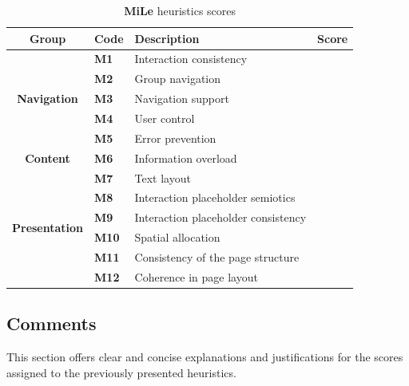 \begin{table}[htp!]
    \centering
    \begin{tabular}{ |c|l|l|c| }
        \hline
        \textbf{Group} & \textbf{Code} & \textbf{Description} & \textbf{Score}\\
        \hline
        \multirow{5}{*}{\textbf{Navigation}} & \textbf{M1} & Interaction consistency & \textbf{\color{unicefGreen}{4}}\\
        \cline{2-4}
        & \textbf{M2} & Group navigation & \textbf{\color{unicefRed}{2}}\\
        \cline{2-4}
        & \textbf{M3} & Navigation support & \textbf{\color{unicefRed}{2}}\\
        \cline{2-4}
        & \textbf{M4} & User control & \textbf{\color{unicefRed}{1}}\\
        \cline{2-4}
        & \textbf{M5} & Error prevention & \textbf{\color{unicefOrange}{3}}\\
        \hline
        \textbf{Content} & \textbf{M6} & Information overload & \textbf{\color{unicefOrange}{3}}\\
        \hline
        \multirow{6}{*}{\textbf{Presentation}} & \textbf{M7} & Text layout & \textbf{\color{unicefGreen}{5}}\\
        \cline{2-4}
        & \textbf{M8} & Interaction placeholder semiotics & \textbf{\color{unicefGreen}{5}}\\
        \cline{2-4}
        & \textbf{M9} & Interaction placeholder consistency & \textbf{\color{unicefGreen}{5}}\\
        \cline{2-4}
        & \textbf{M10} & Spatial allocation & \textbf{\color{unicefGreen}{4}}\\
        \cline{2-4}
        & \textbf{M11} & Consistency of the page structure & \textbf{\color{unicefGreen}{4}}\\
        \cline{2-4}
        & \textbf{M12} & Coherence in page layout & \textbf{\color{unicefGreen}{5}}\\
        \hline
    \end{tabular}
    \caption{\textbf{MiLe} heuristics scores}
\end{table}
\newpage
\subsection{Comments}
This section offers clear and concise explanations and justifications for the scores assigned to the previously presented heuristics.
